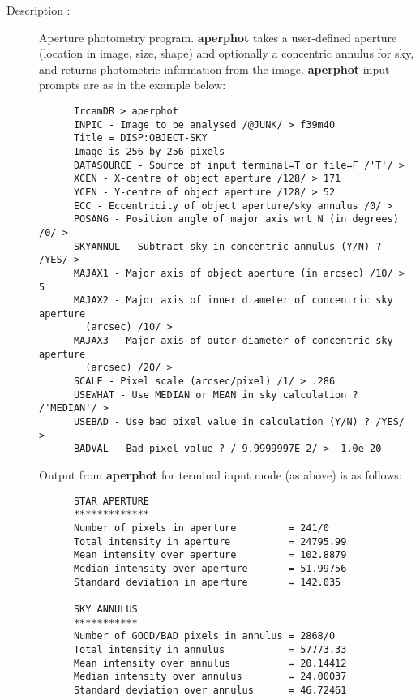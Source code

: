 \begin{description}

\item[Description :] Aperture photometry program.  {\bf aperphot} takes a
user-defined aperture (location in image, size, shape) and optionally a
concentric annulus for sky, and returns photometric information from
the image.  {\bf aperphot} input prompts are as in the example below:

\begin{small}
\begin{verbatim}
      IrcamDR > aperphot
      INPIC - Image to be analysed /@JUNK/ > f39m40
      Title = DISP:OBJECT-SKY
      Image is 256 by 256 pixels
      DATASOURCE - Source of input terminal=T or file=F /'T'/ >
      XCEN - X-centre of object aperture /128/ > 171
      YCEN - Y-centre of object aperture /128/ > 52
      ECC - Eccentricity of object aperture/sky annulus /0/ >
      POSANG - Position angle of major axis wrt N (in degrees) /0/ >
      SKYANNUL - Subtract sky in concentric annulus (Y/N) ? /YES/ >
      MAJAX1 - Major axis of object aperture (in arcsec) /10/ > 5
      MAJAX2 - Major axis of inner diameter of concentric sky aperture
        (arcsec) /10/ >
      MAJAX3 - Major axis of outer diameter of concentric sky aperture
        (arcsec) /20/ >
      SCALE - Pixel scale (arcsec/pixel) /1/ > .286
      USEWHAT - Use MEDIAN or MEAN in sky calculation ? /'MEDIAN'/ >
      USEBAD - Use bad pixel value in calculation (Y/N) ? /YES/ >
      BADVAL - Bad pixel value ? /-9.9999997E-2/ > -1.0e-20
\end{verbatim}
\end{small}

Output from {\bf aperphot} for terminal input mode (as above) is as follows:

\begin{small}
\begin{verbatim}
      STAR APERTURE
      *************
      Number of pixels in aperture         = 241/0
      Total intensity in aperture          = 24795.99
      Mean intensity over aperture         = 102.8879
      Median intensity over aperture       = 51.99756
      Standard deviation in aperture       = 142.035

      SKY ANNULUS
      ***********
      Number of GOOD/BAD pixels in annulus = 2868/0
      Total intensity in annulus           = 57773.33
      Mean intensity over annulus          = 20.14412
      Median intensity over annulus        = 24.00037
      Standard deviation over annulus      = 46.72461


\end{verbatim}
\end{small}
\end{description}
